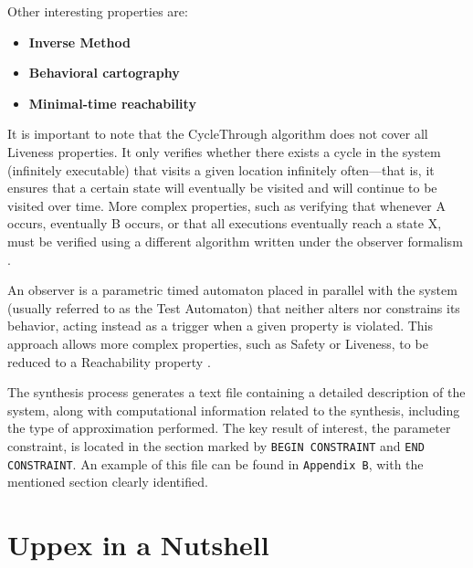 Other interesting properties are:

\begin{itemize}
    \item \textbf{Inverse Method} 

    \item \textbf{Behavioral cartography} 

    \item \textbf{Minimal-time reachability}


\end{itemize}

It is important to note that the CycleThrough algorithm does not cover all Liveness properties. It only verifies whether there exists a cycle in the system (infinitely executable) that visits a given location infinitely often—that is, it ensures that a certain state will eventually be visited and will continue to be visited over time. More complex properties, such as verifying that whenever A occurs, eventually B occurs, or that all executions eventually reach a state X, must be verified using a different algorithm written under the observer formalism \cite{IMITATOR}.

An observer is a parametric timed automaton placed in parallel with the system (usually referred to as the Test Automaton) that neither alters nor constrains its behavior, acting instead as a trigger when a given property is violated. This approach allows more complex properties, such as Safety or Liveness, to be reduced to a Reachability property \cite{observers}.


The synthesis process generates a text file containing a detailed description of the system, along with computational information related to the synthesis, including the type of approximation performed. The key result of interest, the parameter constraint, is located in the section marked by \texttt{BEGIN CONSTRAINT} and \texttt{END CONSTRAINT}. An example of this file can be found in \texttt{Appendix B}, with the mentioned section clearly identified.


\section{Uppex in a Nutshell}

